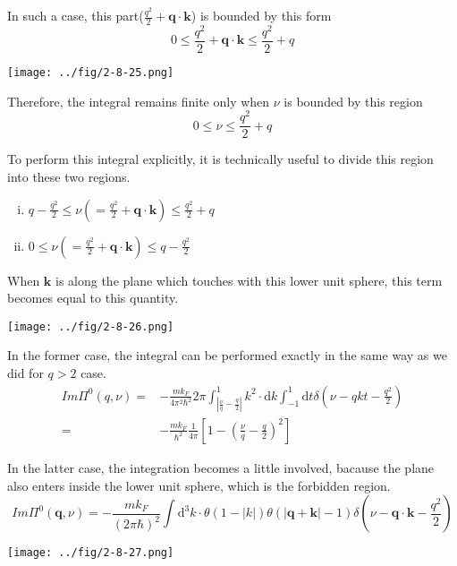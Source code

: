 In such a case, this part($\frac{q^2}{2} + \mathbf{q} \cdot \mathbf{k}$) is bounded by this form
\[ 0 \leq \frac{q^2}{2} + \mathbf{q} \cdot \mathbf{k} \leq \frac{q^2}{2} + q \]
\begin{center}\label{Fig2.8.25}
\texttt{[image: ../fig/2-8-25.png]}
\end{center}

Therefore, the integral remains finite only when $\nu$ is bounded by this region
\[ 0 \leq \nu \leq \frac{q^2}{2} + q \]

To perform this integral explicitly, it is technically useful to divide this region into these two regions.
\begin{enumerate}[(i)]
\item $q-\frac{q^2}{2} \leq \nu(=\frac{q^2}{2}+\mathbf{q}\cdot\mathbf{k}) \leq \frac{q^2}{2} + q$
\item $0\leq \nu(=\frac{q^2}{2}+\mathbf{q}\cdot\mathbf{k}) \leq q - \frac{q^2}{2}$
\end{enumerate}

When $\mathbf{k}$ is along the plane which touches with this lower unit sphere, this term becomes equal to this quantity.
\begin{center}\label{Fig2.8.26}
\texttt{[image: ../fig/2-8-26.png]}
\end{center}

In the former case, the integral can be performed exactly in the same way as we did for $q>2$ case.
\begin{equation} \label{Eqs2.8.22} \begin{split}
Im\Pi^0(q,\nu) =& -\frac{m k_F}{4\pi^2 \hbar^2} 2\pi \int_{|\frac{\nu}{q} - \frac{q}{2}|}^{1} k^2  \cdot \mathrm{d} k \int_{-1}^{1} \mathrm{d} t \delta(\nu - qkt - \frac{q^2}{2})\\
=& - \frac{m k_F}{\hbar^2}\frac{1}{4\pi} \left[ 1-\left( \frac{\nu}{q}-\frac{q}{2} \right)^2 \right]
\end{split}\end{equation}

In the latter case, the integration becomes a little involved, bacause the plane also enters inside the lower unit sphere, which is the forbidden region.
\[ Im\Pi^0(\mathbf{q},\nu) = -\frac{m k_F}{(2\pi \hbar)^2} \int \mathrm{d}^3 k \cdot \theta(1-|k|) \theta(|\mathbf{q}+\mathbf{k}|-1) \delta(\nu-\mathbf{q}\cdot\mathbf{k}-\frac{q^2}{2})
\]

\begin{center}\label{Fig2.8.27}
\texttt{[image: ../fig/2-8-27.png]}
\end{center}

